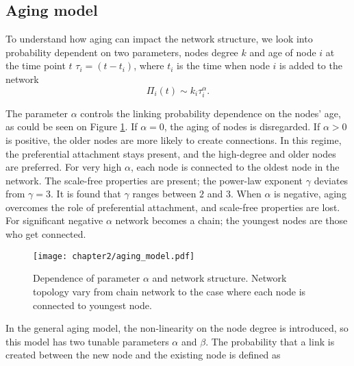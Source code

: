 \subsection{Aging model}

To understand how aging can impact the network structure, we look into probability dependent on two parameters, nodes degree $k$ and age of node $i$ at the time point $t$ $\tau_i=(t-t_i)$, where $t_i$ is the time when node $i$ is added to the network \cite{dorogovtsev2000b} 
\begin{equation}
\Pi_{i}(t)\sim k_{i}\tau_{i}^{\alpha}.
\label{eq:aging}
\end{equation}

The parameter $\alpha$ controls the linking probability dependence on the nodes' age, as could be seen on Figure \ref{fig:aging}. If $\alpha=0$, the aging of nodes is disregarded. If $\alpha>0$ is positive, the older nodes are more likely to create connections. In this regime, the preferential attachment stays present, and the high-degree and older nodes are preferred. For very high $\alpha$, each node is connected to the oldest node in the network. The scale-free properties are present; the power-law exponent $\gamma$ deviates from $\gamma=3$. It is found that $\gamma$ ranges between $2$ and $3$. When $\alpha$ is negative, aging overcomes the role of preferential attachment, and scale-free properties are lost. For significant negative $\alpha$ network becomes a chain; the youngest nodes are those who get connected. 

\begin{figure}[h]
	\centering
	\texttt{[image: chapter2/aging\_model.pdf]}
	\caption[Aging model.]{Dependence of parameter $\alpha$ and network structure. Network topology vary from chain network to the case where each node is connected to youngest node. }
	\label{fig:aging}
\end{figure}

In the general aging model, the non-linearity on the node degree is introduced, so this model has two tunable parameters $\alpha $ and $\beta$. The probability that a link is created between the new node and the existing node is defined as \cite{hajra2004}

